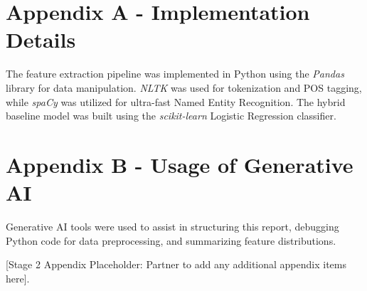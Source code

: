 \documentclass[12pt,a4paper,twocolumn]{article}
\begin{document}



\appendix

\section{Appendix A - Implementation Details}
The feature extraction pipeline was implemented in Python using the \textit{Pandas} library for data manipulation. \textit{NLTK} was used for tokenization and POS tagging, while \textit{spaCy} was utilized for ultra-fast Named Entity Recognition. The hybrid baseline model was built using the \textit{scikit-learn} Logistic Regression classifier.

\section{Appendix B - Usage of Generative AI}
Generative AI tools were used to assist in structuring this report, debugging Python code for data preprocessing, and summarizing feature distributions. 

[Stage 2 Appendix Placeholder: Partner to add any additional appendix items here].
\end{document}
